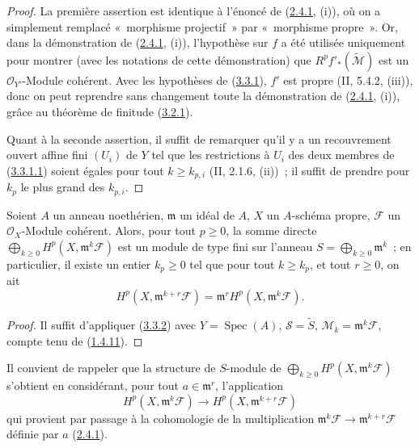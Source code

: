 \begin{proof}
La première assertion est identique à l'énoncé de
(\hyperref[III.2.4.1-fr]{2.4.1}, (i)), où on a simplement remplacé
«~morphisme projectif~» par «~morphisme propre~». Or, dans la démonstration
de (\hyperref[III.2.4.1-fr]{2.4.1}, (i)), l'hypothèse sur $f$ a été utilisée
uniquement pour montrer (avec les notations de cette démonstration) que
$R^pf'_*(\widetilde{\mathcal M})$ est un $\mathcal O_{Y'}$-Module cohérent.
Avec les hypothèses de (\hyperref[III.3.3.1-fr]{3.3.1}), $f'$ est propre
(II, 5.4.2, (iii)), donc on peut reprendre sans changement toute la
démonstration de (\hyperref[III.2.4.1-fr]{2.4.1}, (i)), grâce au théorème de
finitude (\hyperref[III.3.2.1-fr]{3.2.1}).

Quant à la seconde assertion, il suffit de remarquer qu'il y a un
recouvrement ouvert affine fini $(U_i)$ de $Y$ tel que les restrictions à
$U_i$ des deux membres de
(\hyperref[III.3.3.1.1-fr]{3.3.1.1}) soient égales pour tout
$k\geq k_{p,i}$ (II, 2.1.6, (ii))~; il suffit de prendre pour $k_p$ le plus
grand des $k_{p,i}$.
\end{proof}

\begin{corollary}[3.3.2]
\label{III.3.3.2-fr}
Soient $A$ un anneau noethérien, $\mathfrak m$ un idéal de $A$, $X$ un
$A$-schéma propre, $\mathcal F$ un $\mathcal O_X$-Module cohérent. Alors,
pour tout $p\geq0$, la somme directe
$\bigoplus_{k\geq0}H^p(X,\mathfrak m^k\mathcal F)$ est un module de type fini
sur l'anneau $S=\bigoplus_{k\geq0}\mathfrak m^k$~; en particulier, il existe
un entier $k_p\geq0$ tel que pour tout $k\geq k_p$, et tout $r\geq0$, on ait
\[
H^p(X,\mathfrak m^{k+r}\mathcal F)
=\mathfrak m^rH^p(X,\mathfrak m^k\mathcal F).
\tag{3.3.3.1}\label{III.3.3.2.1-fr}
\]
\end{corollary}

\begin{proof}
Il suffit d'appliquer (\hyperref[III.3.3.2-fr]{3.3.2}) avec
$Y=\operatorname{Spec}(A)$, $\mathcal S=\widetilde S$,
$\mathcal M_k=\mathfrak m^k\mathcal F$, compte tenu de
(\hyperref[III.1.4.11-fr]{1.4.11}).
\end{proof}

Il convient de rappeler que la structure de $S$-module de
$\bigoplus_{k\geq0}H^p(X,\mathfrak m^k\mathcal F)$ s'obtient en considérant,
pour tout $a\in\mathfrak m^r$, l'application
\[
H^p(X,\mathfrak m^k\mathcal F)
\longrightarrow H^p(X,\mathfrak m^{k+r}\mathcal F)
\]
qui provient par passage à la cohomologie de la multiplication
$\mathfrak m^k\mathcal F\to\mathfrak m^{k+r}\mathcal F$ définie par $a$
(\hyperref[III.2.4.1-fr]{2.4.1}).

